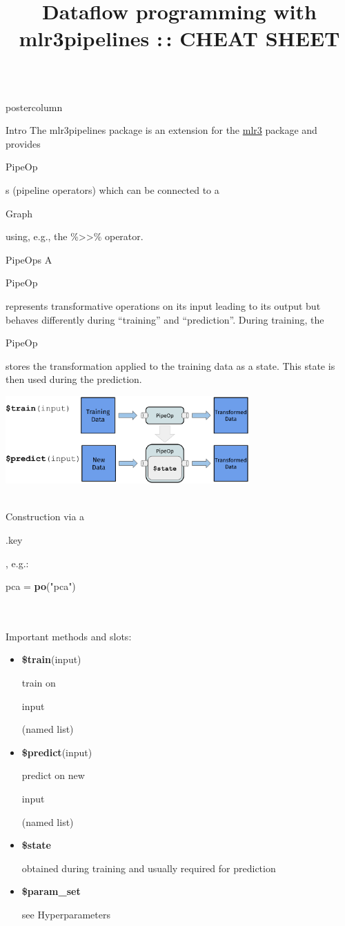 \documentclass{beamer}
\title{Dataflow programming with mlr3pipelines :\,: CHEAT SHEET} %
\newlength{\columnheight} %
\newcommand{\codeinline}[1]{\begin{codeboxinline}#1\end{codeboxinline}}
\begin{document}
\begin{frame}[fragile]{}
	\begin{columns}
		\begin{column}{.245\textwidth}
			\begin{beamercolorbox}[center]{postercolumn}
				\begin{minipage}{.98\textwidth}
					\parbox[t][\columnheight]{\textwidth}{
						\begin{myblock}{Intro}
              The mlr3pipelines package is an extension for the \href{https://github.com/mlr-org/mlr3}{mlr3} package and provides \codeinline{PipeOp}s (pipeline operators) which can be connected to a \codeinline{Graph} using, e.g., the \%>{}>\% operator.
            \end{myblock}
						\begin{myblock}{PipeOps}
              A \codeinline{PipeOp} represents transformative operations on its input leading to its output but behaves differently during ``training'' and ``prediction''. During training, the \codeinline{PipeOp} stores the transformation applied to the training data as a state. This state is then used during the prediction.
              \begin{center}
                \includegraphics[width=0.7\textwidth]{img/po.pdf}
              \end{center}
              \ \\
              Construction via a \codeinline{.key}, e.g.: \codeinline{pca = \textbf{po}("pca")} \\
              \ \\
              Important methods and slots:
              \begin{itemize}
                \item \codeinline{\textbf{\$train}(input)} train on \codeinline{input} (named list)
                \item \codeinline{\textbf{\$predict}(input)} predict on new \codeinline{input} (named list)
                \item \codeinline{\textbf{\$state}} obtained during training and usually required for prediction
                \item \codeinline{\textbf{\$param\_set}} see Hyperparameters

\end{itemize}
\end{myblock}}
\end{minipage}
\end{beamercolorbox}
\end{column}
\end{columns}
\end{frame}
\end{document}

